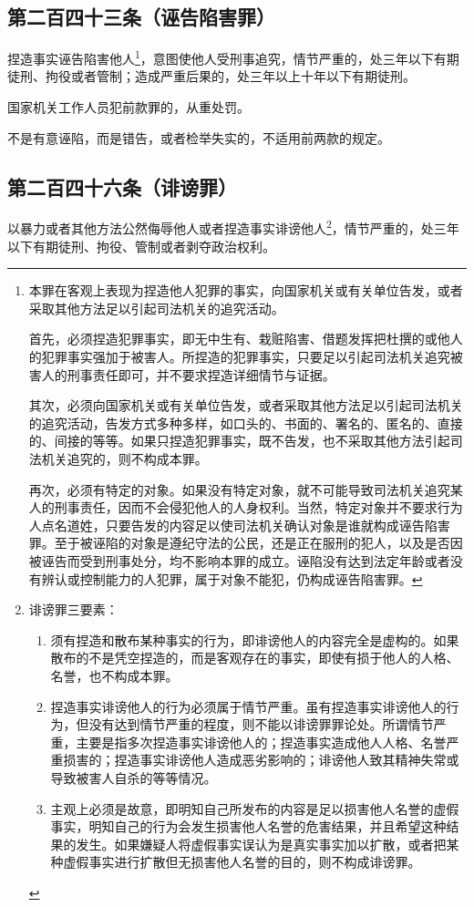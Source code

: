 \documentclass[utf-8,10pt]{ctexart}
\begin{document}
\subsection{第二百四十三条（诬告陷害罪）}
捏造事实诬告陷害他人\footnote{
本罪在客观上表现为捏造他人犯罪的事实，向国家机关或有关单位告发，或者采取其他方法足以引起司法机关的追究活动。

首先，必须捏造犯罪事实，即无中生有、栽赃陷害、借题发挥把杜撰的或他人的犯罪事实强加于被害人。所捏造的犯罪事实，只要足以引起司法机关追究被害人的刑事责任即可，并不要求捏造详细情节与证据。

其次，必须向国家机关或有关单位告发，或者采取其他方法足以引起司法机关的追究活动，告发方式多种多样，如口头的、书面的、署名的、匿名的、直接的、间接的等等。如果只捏造犯罪事实，既不告发，也不采取其他方法引起司法机关追究的，则不构成本罪。

再次，必须有特定的对象。如果没有特定对象，就不可能导致司法机关追究某人的刑事责任，因而不会侵犯他人的人身权利。当然，特定对象并不要求行为人点名道姓，只要告发的内容足以使司法机关确认对象是谁就构成诬告陷害罪。至于被诬陷的对象是遵纪守法的公民，还是正在服刑的犯人，以及是否因被诬告而受到刑事处分，均不影响本罪的成立。诬陷没有达到法定年龄或者没有辨认或控制能力的人犯罪，属于对象不能犯，仍构成诬告陷害罪。
}，意图使他人受刑事追究，情节严重的，处三年以下有期徒刑、拘役或者管制；造成严重后果的，处三年以上十年以下有期徒刑。

国家机关工作人员犯前款罪的，从重处罚。

不是有意诬陷，而是错告，或者检举失实的，不适用前两款的规定。
\subsection{第二百四十六条（诽谤罪）}
以暴力或者其他方法公然侮辱他人或者捏造事实诽谤他人\footnote{
诽谤罪三要素：
\begin{enumerate}
\item 须有捏造和散布某种事实的行为，即诽谤他人的内容完全是虚构的。如果散布的不是凭空捏造的，而是客观存在的事实，即使有损于他人的人格、名誉，也不构成本罪。
\item 捏造事实诽谤他人的行为必须属于情节严重。虽有捏造事实诽谤他人的行为，但没有达到情节严重的程度，则不能以诽谤罪罪论处。所谓情节严重，主要是指多次捏造事实诽谤他人的；捏造事实造成他人人格、名誉严重损害的；捏造事实诽谤他人造成恶劣影响的；诽谤他人致其精神失常或导致被害人自杀的等等情况。
\item 主观上必须是故意，即明知自己所发布的内容是足以损害他人名誉的虚假事实，明知自己的行为会发生损害他人名誉的危害结果，并且希望这种结果的发生。如果嫌疑人将虚假事实误认为是真实事实加以扩散，或者把某种虚假事实进行扩散但无损害他人名誉的目的，则不构成诽谤罪。
\end{enumerate}
}，情节严重的，处三年以下有期徒刑、拘役、管制或者剥夺政治权利。
\end{document}
